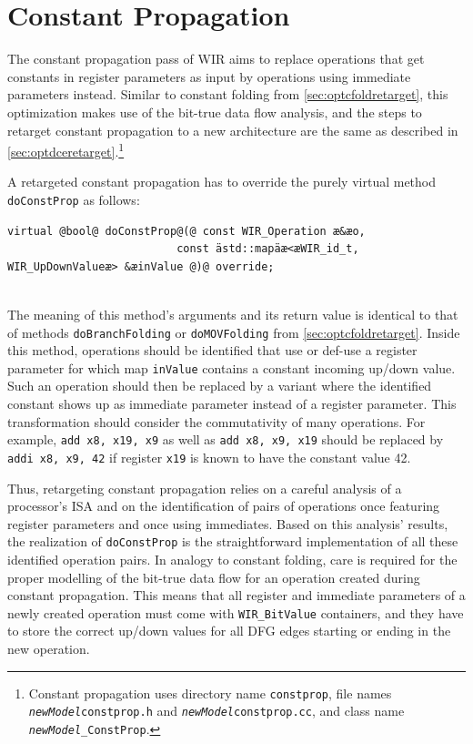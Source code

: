 \section{Constant Propagation}
\label{sec:optcpropretarget}

The constant propagation pass of \gls{WIR} aims to replace operations that get constants in register parameters as input by operations using immediate parameters instead.
Similar to constant folding from \cref{sec:optcfoldretarget}, this optimization makes use of the bit-true data flow analysis, and the steps to retarget constant propagation to a new architecture are the same as described in \cref{sec:optdceretarget}.\footnote{Constant propagation uses directory name \texttt{constprop}, file names \texttt{{\itshape newModel}constprop.h} and \texttt{{\itshape newModel}constprop.cc}, and class name \texttt{{\itshape newModel}\_ConstProp}.}

A retargeted constant propagation has to override the purely virtual method \texttt{doConstProp} as follows: \\
\begin{lstlisting}[style=code,float=!ht,aboveskip=-0.8 \baselineskip,belowskip=-0.8 \baselineskip]
virtual @bool@ doConstProp@(@ const WIR_Operation æ&æo,
                          const ästd::mapäæ<æWIR_id_t, WIR_UpDownValueæ> &æinValue @)@ override;
\end{lstlisting}
\\
The meaning of this method's arguments and its return value is identical to that of methods \texttt{doBranchFolding} or \texttt{doMOVFolding} from \cref{sec:optcfoldretarget}.
Inside this method, operations should be identified that use or def-use a register parameter for which map \texttt{inValue} contains a constant incoming up/down value.
Such an operation should then be replaced by a variant where the identified constant shows up as immediate parameter instead of a register parameter.
This transformation should consider the commutativity of many operations.
For example, \texttt{add x8, x19, x9} as well as \texttt{add x8, x9, x19} should be replaced by \texttt{addi x8, x9, 42} if register \texttt{x19} is known to have the constant value 42.

Thus, retargeting constant propagation relies on a careful analysis of a processor's \gls{ISA} and on the identification of pairs of operations once featuring register parameters and once using immediates.
Based on this analysis' results, the realization of \texttt{doConstProp} is the straightforward implementation of all these identified operation pairs.
In analogy to constant folding, care is required for the proper modelling of the bit-true data flow for an operation created during constant propagation.
This means that all register and immediate parameters of a newly created operation must come with \texttt{WIR\_BitValue} containers, and they have to store the correct up/down values for all \gls{DFG} edges starting or ending in the new operation.


